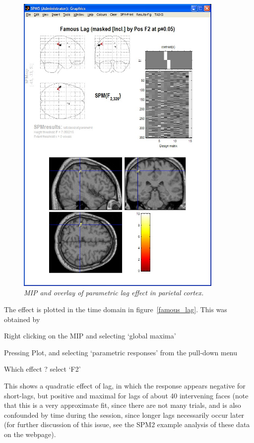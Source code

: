 \begin{figure}
\begin{center}
\includegraphics[width=100mm]{faces/famous_lag_mip}
\caption{\em MIP and overlay of parametric lag effect in parietal cortex. \label{famous_lag_mip} }
\end{center}
\end{figure}
The effect is plotted in the time domain in figure~\ref{famous_lag}. This was obtained by
\bi
\item{Right clicking on the MIP and selecting `global maxima'}
\item{Pressing Plot, and selecting `parametric responses' from the pull-down menu}
\item{Which effect ? select `F2'}
\ei

This shows a quadratic effect of lag, in which the response appears negative for short-lags, but positive and maximal for lags of about 40 intervening faces (note that this is a very approximate fit, since there are not many trials, and is also confounded by time during the session, since longer lags necessarily occur later (for further discussion of this issue, see the SPM2 example analysis of these data on the webpage).

